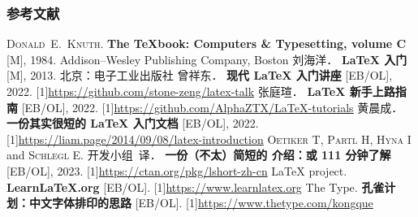 \begin{frame}[fragile]
	\frametitle{参考文献}
	\newcommand{\BOOK}[1]{\textbf{#1}}
	\newcommand{\TAG}[1]{[#1]}
	\newcommand{\URL}[1]{\scalebox{0.92}[1]{\mdseries\url{#1}}}
	\begin{multicols}{2}
		\begin{thebibliography}{99}
			\bibitem{}
			\textsc{Donald~E.\ Knuth}.
			\BOOK{The \TeX book: Computers \& Typesetting, volume C} \TAG{M}, 1984.
			\newblock Addison--Wesley Publishing Company, Boston
			\bibitem{}
			刘海洋．
			\BOOK{\LaTeX{} 入门} \TAG{M}, 2013.
			\newblock 北京：电子工业出版社
			\bibitem{}
			曾祥东．
			\BOOK{现代 \LaTeX{} 入门讲座} \TAG{EB/OL}, 2022.
			\newblock \URL{https://github.com/stone-zeng/latex-talk}
			\bibitem{}
			张庭瑄．
			\BOOK{\LaTeX{} 新手上路指南} \TAG{EB/OL}, 2022.
			\newblock \URL{https://github.com/AlphaZTX/LaTeX-tutorials}
			\bibitem{}
			黄晨成．
			\BOOK{一份其实很短的 \LaTeX{} 入门文档} \TAG{EB/OL}, 2022.
			\newblock \URL{https://liam.page/2014/09/08/latex-introduction}
			\bibitem{}
			\textsc{Oetiker T}, \textsc{Partl H}, \textsc{Hyna I} and \textsc{Schlegl E}.
			\CTeX{} 开发小组~译．
			\BOOK{一份（不太）简短的 \LaTeXe{} 介绍：或 111 分钟了解 \LaTeXe{}} \TAG{EB/OL}, 2023.
			\newblock \URL{https://ctan.org/pkg/lshort-zh-cn}
			\bibitem{}
			\LaTeX{} project.
			\BOOK{Learn\LaTeX.org} \TAG{EB/OL}.
			\newblock \URL{https://www.learnlatex.org}
			\bibitem{}
			The Type.
			\BOOK{孔雀计划：中文字体排印的思路} \TAG{EB/OL}.
			\newblock \URL{https://www.thetype.com/kongque}
		\end{thebibliography}
	\end{multicols}
\end{frame}